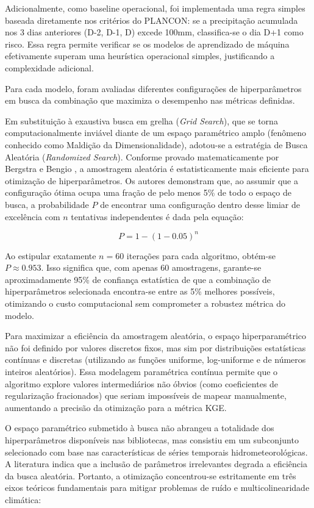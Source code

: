 \documentclass[12pt]{article}
\begin{document}
Adicionalmente, como baseline operacional, foi implementada uma regra simples baseada diretamente nos critérios do PLANCON: se a precipitação acumulada nos 3 dias anteriores (D-2, D-1, D) excede 100mm, classifica-se o dia D+1 como risco. Essa regra permite verificar se os modelos de aprendizado de máquina efetivamente superam uma heurística operacional simples, justificando a complexidade adicional.

Para cada modelo, foram avaliadas diferentes configurações de hiperparâmetros em busca da combinação que maximiza o desempenho nas métricas definidas.

Em substituição à exaustiva busca em grelha (\textit{Grid Search}), que se torna computacionalmente inviável diante de um espaço paramétrico amplo (fenômeno conhecido como Maldição da Dimensionalidade), adotou-se a estratégia de Busca Aleatória (\textit{Randomized Search}). Conforme provado matematicamente por Bergstra e Bengio \cite{bergstra2012}, a amostragem aleatória é estatisticamente mais eficiente para otimização de hiperparâmetros. Os autores demonstram que, ao assumir que a configuração ótima ocupa uma fração de pelo menos 5\% de todo o espaço de busca, a probabilidade $P$ de encontrar uma configuração dentro desse limiar de excelência com $n$ tentativas independentes é dada pela equação:

\begin{equation}
    P = 1 - (1 - 0.05)^n
\end{equation}

Ao estipular exatamente $n = 60$ iterações para cada algoritmo, obtém-se $P \approx 0.953$. Isso significa que, com apenas 60 amostragens, garante-se aproximadamente 95\% de confiança estatística de que a combinação de hiperparâmetros selecionada encontra-se entre as 5\% melhores possíveis, otimizando o custo computacional sem comprometer a robustez métrica do modelo.

Para maximizar a eficiência da amostragem aleatória, o espaço hiperparamétrico não foi definido por valores discretos fixos, mas sim por distribuições estatísticas contínuas e discretas (utilizando as funções uniforme, log-uniforme e de números inteiros aleatórios). Essa modelagem paramétrica contínua permite que o algoritmo explore valores intermediários não óbvios (como coeficientes de regularização fracionados) que seriam impossíveis de mapear manualmente, aumentando a precisão da otimização para a métrica KGE.

O espaço paramétrico submetido à busca não abrangeu a totalidade dos hiperparâmetros disponíveis nas bibliotecas, mas consistiu em um subconjunto selecionado com base nas características de séries temporais hidrometeorológicas. A literatura indica que a inclusão de parâmetros irrelevantes degrada a eficiência da busca aleatória. Portanto, a otimização concentrou-se estritamente em três eixos teóricos fundamentais para mitigar problemas de ruído e multicolinearidade climática:
\end{document}
